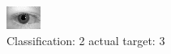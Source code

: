 \begin{figure}[h!]
\begin{center}
\includegraphics[width=0.60\columnwidth]{figures/ID623_class_2_target_3.png}
\end{center}
\caption{ Classification: 2 actual target: 3}
\label{fig:ID623_class_2_target_3}
\end{figure}
